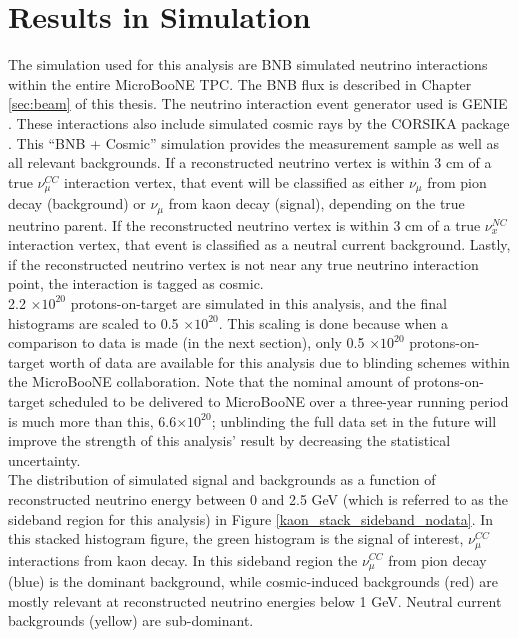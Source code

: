 \section{Results in Simulation}
The simulation used for this analysis are BNB simulated neutrino interactions within the entire MicroBooNE TPC. The BNB flux is described in Chapter \ref{sec:beam} of this thesis. The neutrino interaction event generator used is GENIE \cite{GENIEsource}. These interactions also include simulated cosmic rays by the CORSIKA package \cite{CORSIKAsource}. This ``BNB + Cosmic'' simulation provides the measurement sample as well as all relevant backgrounds. If a reconstructed neutrino vertex is within 3 cm of a true $\nu_\mu^{CC}$ interaction vertex, that event will be classified as either $\nu_\mu$ from pion decay (background) or $\nu_\mu$ from kaon decay (signal), depending on the true neutrino parent. If the reconstructed neutrino vertex is within 3 cm of a true $\nu_x^{NC}$ interaction vertex, that event is classified as a neutral current background. Lastly, if the reconstructed neutrino vertex is not near any true neutrino interaction point, the interaction is tagged as cosmic.\\

2.2 $\times 10^{20}$ protons-on-target are simulated in this analysis, and the final histograms are scaled to 0.5 $\times 10^{20}$. This scaling is done because when a comparison to data is made (in the next section), only 0.5 $\times 10^{20}$ protons-on-target worth of data are available for this analysis due to blinding schemes within the MicroBooNE collaboration. Note that the nominal amount of protons-on-target scheduled to be delivered to MicroBooNE over a three-year running period is much more than this, 6.6$\times 10^{20}$; unblinding the full data set in the future will improve the strength of this analysis' result by decreasing the statistical uncertainty. \\

The distribution of simulated signal and backgrounds as a function of reconstructed neutrino energy between 0 and 2.5 GeV (which is referred to as the sideband region for this analysis) in Figure \ref{kaon_stack_sideband_nodata}. In this stacked histogram figure, the green histogram is the signal of interest, $\nu_\mu^{CC}$ interactions from kaon decay. In this sideband region the $\nu_\mu^{CC}$ from pion decay (blue) is the dominant background, while cosmic-induced backgrounds (red) are mostly relevant at reconstructed neutrino energies below 1 GeV. Neutral current backgrounds (yellow) are sub-dominant.\\

